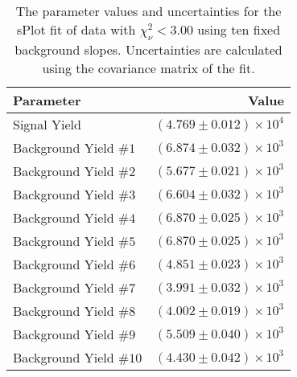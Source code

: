 
\begin{table}[h]
    \begin{center}
        \begin{tabular}{lr}\toprule
            Parameter & Value \\\midrule
            Signal Yield & $(4.769 \pm 0.012) \times 10^{4}$ \\
            Background Yield $\#1$ & $(6.874 \pm 0.032) \times 10^{3}$ \\
            Background Yield $\#2$ & $(5.677 \pm 0.021) \times 10^{3}$ \\
            Background Yield $\#3$ & $(6.604 \pm 0.032) \times 10^{3}$ \\
            Background Yield $\#4$ & $(6.870 \pm 0.025) \times 10^{3}$ \\
            Background Yield $\#5$ & $(6.870 \pm 0.025) \times 10^{3}$ \\
            Background Yield $\#6$ & $(4.851 \pm 0.023) \times 10^{3}$ \\
            Background Yield $\#7$ & $(3.991 \pm 0.032) \times 10^{3}$ \\
            Background Yield $\#8$ & $(4.002 \pm 0.019) \times 10^{3}$ \\
            Background Yield $\#9$ & $(5.509 \pm 0.040) \times 10^{3}$ \\
            Background Yield $\#10$ & $(4.430 \pm 0.042) \times 10^{3}$ \\\bottomrule
        \end{tabular}
        \caption{The parameter values and uncertainties for the sPlot fit of data with $\chi^2_\nu < 3.00$ using ten fixed background slopes. Uncertainties are calculated using the covariance matrix of the fit.}
    \end{center}
\end{table}
